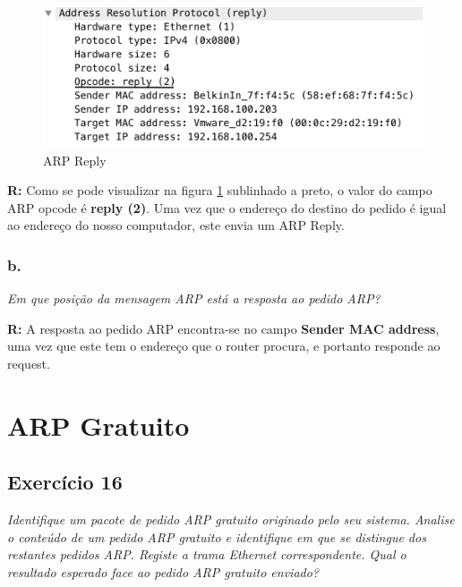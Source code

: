 \documentclass{llncs}
\begin{document}
\begin{figure}[H]
\begin{center}
\includegraphics[scale=0.45]{15_a.png} 
\end{center}
\caption{\label{fig:15_a}ARP Reply}
\end{figure} 
\par
\textbf{R:} Como se pode visualizar na figura \ref{fig:15_a} sublinhado a preto, o valor do campo ARP opcode é \textbf{reply (2)}. Uma vez que o endereço do destino do pedido é igual ao endereço do nosso computador, este envia um ARP Reply.


\subsubsection{b.}
\emph{Em que posição da mensagem ARP está a resposta ao pedido ARP?}
\\ \par
\textbf{R:} A resposta ao pedido ARP encontra-se no campo \textbf{Sender MAC address}, uma vez que este tem o endereço que o router procura, e portanto responde ao request.

\newpage

\section{ARP Gratuito}

\subsection{Exercício 16}
\emph{Identifique um pacote de pedido ARP gratuito originado pelo seu sistema. Analise o 
conteúdo de um pedido ARP gratuito e identifique em que se distingue dos restantes
pedidos ARP. Registe a trama Ethernet correspondente. Qual o resultado esperado face ao
pedido ARP gratuito enviado?}
\end{document}
